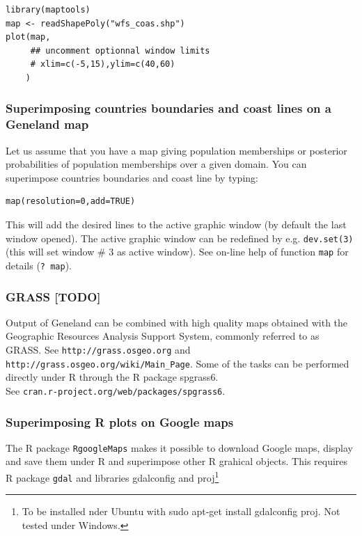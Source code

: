 \documentclass[a4paper,10pt]{article}
\begin{document}
{\footnotesize  
\begin{verbatim}
library(maptools)
map <- readShapePoly("wfs_coas.shp")
plot(map,
     ## uncomment optionnal window limits
     # xlim=c(-5,15),ylim=c(40,60)
    )
\end{verbatim} }


\subsubsection{Superimposing countries boundaries and coast lines on a {\sc Geneland} map}

Let us assume that you have a map giving population memberships or posterior probabilities of population memberships over a given domain. 
You can superimpose countries boundaries and coast line by typing:

\begin{verbatim}
map(resolution=0,add=TRUE)
\end{verbatim}

 


This will add the desired lines to the active graphic window (by default the last window opened). 
The active graphic window can be redefined by e.g. \texttt{dev.set(3)} (this will set window \# 3 as active window). 
See on-line help of function \texttt{map} for details (\texttt{? map}).

\subsubsection{GRASS [TODO]}
Output of {\sc Geneland} can be combined with 
high quality maps obtained with the Geographic Resources Analysis Support System, commonly referred to as GRASS. 
See \texttt{http://grass.osgeo.org} and\\ \texttt{http://grass.osgeo.org/wiki/Main\_Page}.
Some of the tasks can be performed directly under R through the R package spgrass6.\\ 
See \texttt{cran.r-project.org/web/packages/spgrass6}.


\subsubsection[R plots and GoogleMaps]{Superimposing R plots on Google maps}

The R package {\tt RgoogleMaps} makes it possible to download Google maps, display and save them under R and superimpose 
other R grahical objects. This requires R package {\tt gdal} and libraries gdalconfig and proj\footnote{To be installed 
nder Ubuntu with sudo apt-get install gdalconfig proj. Not tested under Windows.}
\end{document}
